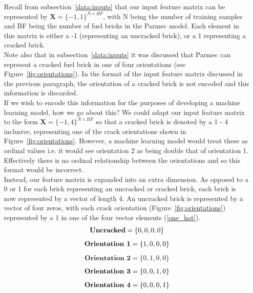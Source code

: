 Recall from subsection~\ref{data:inputs} that our input feature matrix can be represented by $\textbf{X} = \{-1, 1\}^{N \times BF}$, with N being the number of training samples and BF being the number of fuel bricks in the Parmec model. Each element in this matrix is either a -1 (representing an uncracked brick), or a 1 representing a cracked brick. 
\\

\noindent
Note also that in subsection~\ref{data:inputs} it was discussed that Parmec can represent a cracked fuel brick in one of four orientations (see Figure~\ref{fig:orientations}). In the format of the input feature matrix discussed in the previous paragraph, the orientation of a cracked brick is not encoded and this information is discarded. 
\\

\noindent
If we wish to encode this information for the purposes of  developing a machine learning model, how we go about this? We could adapt our input feature matrix to the form $\textbf{X} = \{-1, 4\}^{N \times BF}$ so that a cracked brick is denoted by a 1 - 4 inclusive, representing one of the crack orientations shown in Figure~\ref{fig:orientations}. However, a machine learning model would treat these as ordinal values i.e. it would see orientation 2 as being double that of orientation 1. Effectively there is no ordinal relationship between the orientations and so this format would be incorrect.\\ 

\noindent
Instead, our feature matrix is expanded into an extra dimension. As opposed to a 0 or 1 for each brick representing an uncracked or cracked brick, each brick is now represented by a vector of length 4. An uncracked brick is represented by a vector of four zeros, with each crack orientation (Figure~\ref{fig:orientations}) represented by a 1 in one of the four vector elements (\ref{one_hot}).
\\

\begin{equation} \label{one_hot}
	\textbf{Uncracked} = \{0, 0, 0, 0\}  \notag
\end{equation}
\begin{gather}
	\textbf{Orientation 1} = \{1, 0, 0, 0\}  \notag
\end{gather}
\begin{align}
	\textbf{Orientation 2} = \{0, 1, 0, 0\} 
\end{align}
\begin{align}
	\textbf{Orientation 3} = \{0, 0, 1, 0\}  \notag
\end{align}
\begin{align}
	\textbf{Orientation 4} = \{0, 0, 0, 1\}  \notag
\end{align}

